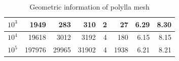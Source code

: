 \documentclass[lineno,pdflatex,sn-mathphys]{sn-jnl}%
\theoremstyle{thmstyleone}%
\theoremstyle{thmstyletwo}%
\theoremstyle{thmstylethree}%
\begin{document}
\begin{table}
{\begin{tabular}{|r|r|r|r|r|r|r|r|}
$10^3$                                                                       & 1949                                                                           & 283                                                                                  & 310                                                                                  & 2                                                                                              & 27                             & 6.29                                                                                  & 8.30                                                                              \\ \hline
$10^4$                                                                       & 19618                                                                          & 3012                                                                                 & 3192                                                                                 & 4                                                                                              & 180                            & 6.15                                                                                  & 8.15                                                                              \\ \hline
$10^5$                                                                       & 197976                                                                         & 29965                                                                                & 31902                                                                                & 4                                                                                              & 1938                           & 6.21                                                                                  & 8.21                                                                              \\ \hline
\end{tabular}
}
\caption{Geometric information of polylla mesh }%
\label{table:results}
\end{table}
\fi
\end{document}
